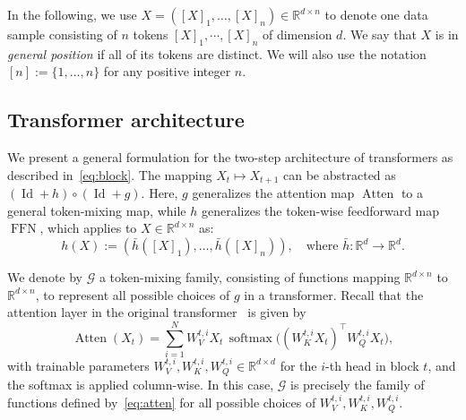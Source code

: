 \documentclass{article}
\newcommand{\lt}[1]{{\footnotesize\textcolor{cyan!60!black}{\tt TL: #1}}}
\begin{document}
In the following, we use $X=([X]_1,\dots, [X]_n)\in\mathbb{R}^{d\times n}$ to denote one data sample consisting of $n$ tokens $[X]_1, \cdots, [X]_n$ of dimension $d$. We say that $X$ is in \emph{general position} if all of its tokens are distinct.
We will also use the notation $[n]:=\{1,\dots,n\}$ for any positive integer $n$.

\subsection{Transformer architecture}
We present a general formulation for the two-step architecture of transformers as described in~\eqref{eq:block}. The mapping $X_t \mapsto X_{t+1}$ can be abstracted as $(\operatorname{Id}+h)\circ (\operatorname{Id}+g)$. Here, $g$ generalizes the attention map $\operatorname{Atten}$ to a general token-mixing map, while $h$ generalizes the token-wise feedforward map $\operatorname{FFN}$, which applies to $X\in\mathbb{R}^{d\times n}$ as:
\begin{equation}
    \label{eq:tensor_type}
    h(X):=(\bar h ([X]_1),\dots,\bar h ([X]_n)),\quad \text{where } \bar h:\mathbb{R}^d\to\mathbb{R}^d.
\end{equation}

We denote by $\mathcal{G}$ a token-mixing family, consisting of functions mapping $\mathbb{R}^{d\times n}$ to $\mathbb{R}^{d\times n}$, to represent all possible choices of $g$ in a transformer. Recall that the attention layer in the original transformer~\cite{vaswani2017attention} is given by
\begin{equation}
    \label{eq:atten}
    \operatorname{Atten}(X_t)=\sum_{i=1}^N W_V^{t,i} X_t\,\operatorname{softmax}\Big((W_K^{t,i} X_t)^\top W_Q^{t,i} X_t\Big),
\end{equation}
with trainable parameters $W_V^{t,i},W_K^{t,i},W_Q^{t,i}\in\mathbb{R}^{d\times d}$ for the $i$-th head in block $t$, and the softmax is applied column-wise.
In this case, $\mathcal G$
 is precisely the family of functions defined by~\eqref{eq:atten} for all possible choices of $W_V^{t,i},W_K^{t,i},W_Q^{t,i}$.
\end{document}
